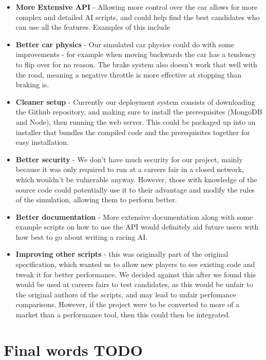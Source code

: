 \begin{itemize}
    \item
        \textbf{More Extensive API} - Allowing more control over the car allows
        for more complex and detailed AI scripts, and could help find the best
        candidates who can use all the features. Examples of this include 
    \item
        \textbf{Better car physics} - Our simulated car physics could do with
        some improvements - for example when moving backwards the car has a
        tendency to flip over for no reason. The brake system also doesn't work
        that well with the road, meaning a negative throttle is more effective
        at stopping than braking is.
    \item
        \textbf{Cleaner setup} - Currently our deployment system consists of
        downloading the Github repository, and making sure to install the
        prerequisites (MongoDB and Node), then running the web server. This
        could be packaged up into an installer that bundles the compiled code
        and the prerequisites together for easy installation.
    \item
        \textbf{Better security} - We don't have much security for our project,
        mainly because it was only required to run at a careers fair in a closed
        network, which wouldn't be vulnerable anyway. However, those with
        knowledge of the source code could potentially use it to their advantage
        and modify the rules of the simulation, allowing them to perform better.
    \item
        \textbf{Better documentation} - More extensive documentation along with
        some example scripts on how to use the API would definitely aid future
        users with how best to go about writing a racing AI.
    \item
        \textbf{Improving other scripts} - this was originally part of the
        original specification, which wanted us to allow new players to see
        existing code and tweak it for better performance. We decided against
        this after we found this would be used at careers fairs to test
        candidates, as this would be unfair to the original authors of the
        scripts, and may lead to unfair perfomance comparisons.
        However, if the project were to be converted to more of a market than a
        performance tool, then this could then be integrated.
\end{itemize}



\section{Final words TODO}
